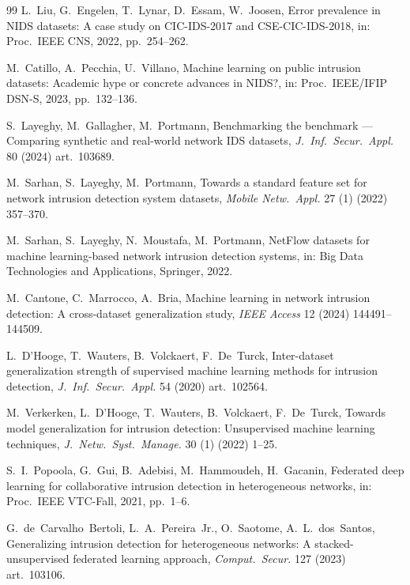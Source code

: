 \documentclass[preprint,12pt,authoryear]{elsarticle}
\begin{document}
\begin{thebibliography}{99}
L.~Liu, G.~Engelen, T.~Lynar, D.~Essam, W.~Joosen, Error prevalence in NIDS
datasets: A case study on CIC-IDS-2017 and CSE-CIC-IDS-2018, in: Proc.\ IEEE CNS,
2022, pp.~254--262.

M.~Catillo, A.~Pecchia, U.~Villano, Machine learning on public intrusion datasets:
Academic hype or concrete advances in NIDS?, in: Proc.\ IEEE/IFIP DSN-S, 2023,
pp.~132--136.

S.~Layeghy, M.~Gallagher, M.~Portmann, Benchmarking the benchmark --- Comparing
synthetic and real-world network IDS datasets, \textit{J.\ Inf.\ Secur.\ Appl.} 80
(2024) art.~103689.

M.~Sarhan, S.~Layeghy, M.~Portmann, Towards a standard feature set for network
intrusion detection system datasets, \textit{Mobile Netw.\ Appl.} 27 (1) (2022)
357--370.

M.~Sarhan, S.~Layeghy, N.~Moustafa, M.~Portmann, NetFlow datasets for machine
learning-based network intrusion detection systems, in: Big Data Technologies and
Applications, Springer, 2022.

M.~Cantone, C.~Marrocco, A.~Bria, Machine learning in network intrusion detection:
A cross-dataset generalization study, \textit{IEEE Access} 12 (2024)
144491--144509.

L.~D'Hooge, T.~Wauters, B.~Volckaert, F.~De~Turck, Inter-dataset generalization
strength of supervised machine learning methods for intrusion detection,
\textit{J.\ Inf.\ Secur.\ Appl.} 54 (2020) art.~102564.

M.~Verkerken, L.~D'Hooge, T.~Wauters, B.~Volckaert, F.~De~Turck, Towards model
generalization for intrusion detection: Unsupervised machine learning techniques,
\textit{J.\ Netw.\ Syst.\ Manage.} 30 (1) (2022) 1--25.

S.~I.~Popoola, G.~Gui, B.~Adebisi, M.~Hammoudeh, H.~Gacanin, Federated deep
learning for collaborative intrusion detection in heterogeneous networks, in:
Proc.\ IEEE VTC-Fall, 2021, pp.~1--6.

G.~de~Carvalho~Bertoli, L.~A.~Pereira~Jr., O.~Saotome, A.~L.~dos~Santos,
Generalizing intrusion detection for heterogeneous networks: A stacked-unsupervised
federated learning approach, \textit{Comput.\ Secur.} 127 (2023) art.~103106.


\end{thebibliography}
\end{document}
